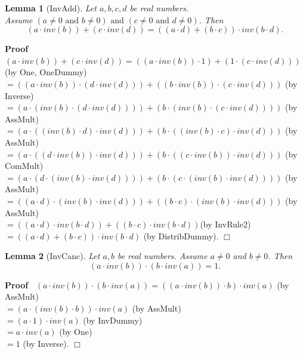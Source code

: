 \documentclass{article}
\newenvironment{forthel}{\begin{leftbar}}{\end{leftbar}}
\newenvironment{proof}{\noindent\textbf{Proof\ }}{\hspace*{\fill}$\Box$\medskip}
\newtheorem{lemma}{Lemma}
\newcommand{\dotequal}{=}
\begin{document}
\begin{forthel}
	
	\begin{lemma}[InvAdd]
	Let $a,b,c,d$ be real numbers. \\Assume $(a \neq 0 \text{ and } b \neq 0) \text{ and } (c \neq 0 \text{ and } d \neq 0)$. 
	Then $$(a \cdot inv(b)) + (c \cdot inv(d)) = ((a \cdot d) + (b \cdot c)) \cdot inv(b \cdot d).$$
	\end{lemma}
	\begin{proof}\\
	$(a \cdot inv(b)) + (c \cdot inv(d)) \dotequal ((a \cdot inv(b)) \cdot 1) + (1 \cdot (c \cdot inv(d)))$ (by One, OneDummy)
	\\$\dotequal ((a \cdot inv(b)) \cdot (d \cdot inv(d))) + ((b \cdot inv(b)) \cdot (c \cdot inv(d)))$ (by Inverse)
	\\$\dotequal (a \cdot (inv(b) \cdot (d \cdot inv(d)))) + (b \cdot (inv(b) \cdot (c \cdot inv(d))))$ (by AssMult)
	\\$\dotequal (a \cdot ((inv(b) \cdot d) \cdot inv(d))) + (b \cdot ((inv(b) \cdot c) \cdot inv(d)))$ (by AssMult)
	\\$\dotequal (a \cdot ((d \cdot inv(b)) \cdot inv(d))) + (b \cdot ((c \cdot inv(b)) \cdot inv(d)))$ (by ComMult)
	\\$\dotequal (a \cdot (d \cdot (inv(b) \cdot inv(d)))) + (b \cdot (c \cdot (inv(b) \cdot inv(d))))$ (by AssMult)
	\\$\dotequal ((a \cdot d) \cdot (inv(b) \cdot inv(d))) + ((b \cdot c) \cdot (inv(b) \cdot inv(d)))$ (by AssMult)
	\\$\dotequal ((a \cdot d) \cdot inv(b \cdot d)) + ((b \cdot c) \cdot inv(b \cdot d)) $(by InvRule2)
	\\$\dotequal ((a \cdot d) + (b \cdot c)) \cdot inv(b \cdot d)$ (by DistribDummy).
	\end{proof}
	
	
	
	\begin{lemma}[InvCanc]
	Let $a, b$ be real numbers. Assume $a \neq 0$ and $b \neq 0$.
	Then $$(a \cdot inv(b)) \cdot (b \cdot inv(a)) = 1.$$
	\end{lemma}
	\begin{proof}
	$(a \cdot inv(b)) \cdot (b \cdot inv(a)) \dotequal ((a \cdot inv(b)) \cdot b) \cdot inv(a)$ (by AssMult)
	\\$\dotequal (a \cdot (inv(b) \cdot b)) \cdot inv(a)$ (by AssMult)
	\\$\dotequal (a \cdot 1) \cdot inv(a)$ (by InvDummy)
	\\$\dotequal a \cdot inv(a)$ (by One)
	\\$\dotequal 1$ (by Inverse).
	\end{proof}
	

\end{forthel}
\end{document}
